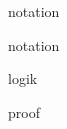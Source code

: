 \documentclass[11pt, a4paper, twoside, bibliography=totoc]{scrartcl}
\begin{document}
{notation}

{notation}

\cleardoublepage

{logik}

\cleardoublepage

{proof}

\cleardoublepage





\cleardoublepage
\printglossaries

\cleardoublepage

\end{document}
